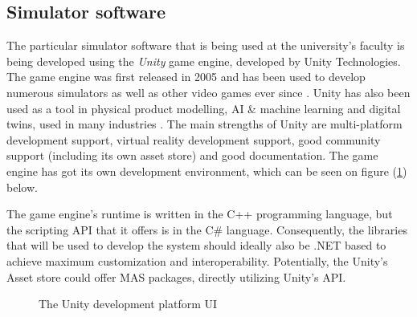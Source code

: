\documentclass[main.tex]{subfiles}
\begin{document}
\subsection{Simulator software}

The particular simulator software that is being used at the university's faculty is being
developed using the \emph{Unity} game engine, developed by Unity Technologies. The game engine
was first released in 2005 and has been used to develop numerous simulators as well as other
video games ever since \cite{UnityTechnologies2022}.  Unity has also been used as a tool in
physical product modelling, AI \& machine learning and digital twins, used in many industries
\cite{UnityTechnologies2022a}.  The main strengths of Unity are multi-platform development
support, virtual reality development support, good community support (including its own asset
store) and good documentation. The game engine has got its own development environment, which 
can be seen on figure (\ref{unity}) below.

The game engine's runtime is written in the C++ programming language, but the scripting API 
that it offers is in the C\# language. Consequently, the libraries that will be used to develop 
the system should ideally also be .NET based to achieve maximum customization and interoperability.
Potentially, the Unity's Asset store could offer MAS packages, directly utilizing Unity's API.

\begin{figure}[htbp]
    \centering
    
    \caption{The Unity development platform UI}
    \label{unity}
\end{figure}
\end{document}
